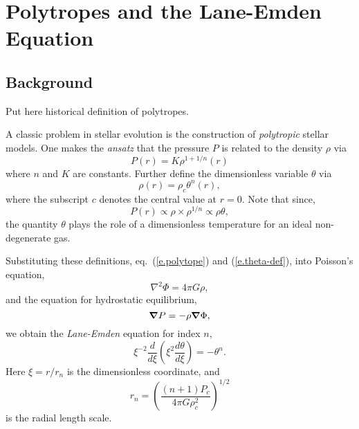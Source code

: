 \chapter{Polytropes and the Lane-Emden Equation}

\section{Background}\label{s.LE-background}

Put here historical definition of polytropes.

A classic problem in stellar evolution is the construction of \emph{polytropic} stellar models. One makes the \emph{ansatz} that the pressure $P$ is related to the density $\rho$ via
\begin{equation}\label{e.polytope}
P(r) = K\rho^{1+1/n}(r)
\end{equation}
where $n$ and $K$ are constants. Further define the dimensionless variable $\theta$ via
\begin{equation}\label{e.theta-def}
\rho(r) = \rho_{c}\theta^{n}(r),
\end{equation}
where the subscript $c$ denotes the central value at $r=0$. Note that since, 
\[ P(r) \propto \rho \times \rho^{1/n} \propto \rho \theta, \]
the quantity $\theta$ plays the role of a dimensionless temperature for an ideal non-degenerate gas.

Substituting these definitions, eq.~(\ref{e.polytope}) and (\ref{e.theta-def}), into Poisson's equation,
\begin{equation}
\nabla^{2}\Phi = 4\pi G\rho,
\end{equation}
and the equation for hydrostatic equilibrium, 
\begin{equation}
\boldsymbol{\nabla} P = -\rho\boldsymbol{\nabla} \Phi,
\end{equation}
we obtain the \emph{Lane-Emden} equation for index $n$,
\begin{equation}\label{e.LE}
\xi^{-2} \frac{d}{d\xi}\left(\xi^{2}\frac{d\theta}{d\xi}\right) = -\theta^{n}.
\end{equation}
Here $\xi = r/r_{n}$ is the dimensionless coordinate, and
\begin{equation}
r_{n} = \left(\frac{(n+1)P_{c}}{4\pi G\rho_{c}^{2}}\right)^{1/2}
\end{equation}
is the radial length scale.

